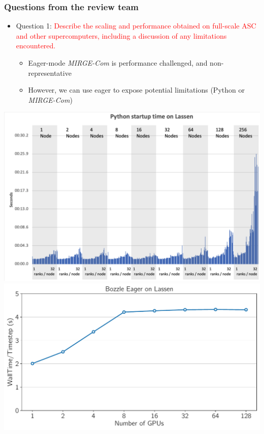 

\begin{frame}\frametitle{Questions from the review team}
  \begin{itemize}
    \item Question 1: \textcolor{red}{Describe the scaling and performance obtained on full-scale ASC and other supercomputers, including a discussion of any limitations encountered.}
    \begin{itemize}  
    \item Eager-mode \textit{MIRGE-Com} is performance challenged, and non-representative
    \item However, we can use eager to expose potential limitations (Python or \textit{MIRGE-Com}) 
    \end{itemize}
  \end{itemize}
  \includegraphics[width=.45\textwidth]{figures/python_at_scale.png}
  \includegraphics[width=.45\textwidth]{figures/gpuscaling.pdf}
\end{frame}

